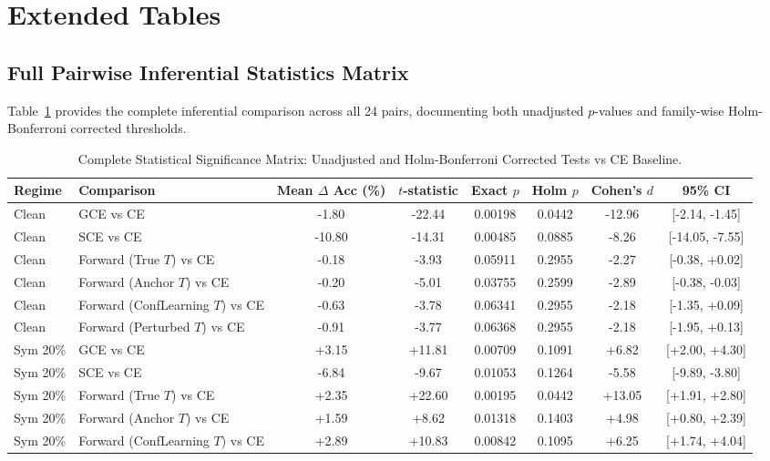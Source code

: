 \documentclass[10pt,twocolumn]{article}
\theoremstyle{definition}
\begin{document}
\section{Extended Tables}

\subsection{Full Pairwise Inferential Statistics Matrix}
Table~\ref{tab:app_pairwise} provides the complete inferential comparison across all 24 pairs, documenting both unadjusted $p$-values and family-wise Holm-Bonferroni corrected thresholds.

\begin{table}[h]
\centering
\caption{Complete Statistical Significance Matrix: Unadjusted and Holm-Bonferroni Corrected Tests vs CE Baseline.}
\label{tab:app_pairwise}
\small
\begin{tabular}{llcccccc}
\toprule
\textbf{Regime} & \textbf{Comparison} & \textbf{Mean $\Delta$ Acc (\%)} & \textbf{$t$-statistic} & \textbf{Exact $p$} & \textbf{Holm $p$} & \textbf{Cohen's $d$} & \textbf{95\% CI} \\
\midrule
Clean & GCE vs CE & -1.80 & -22.44 & 0.00198 & 0.0442 & -12.96 & [-2.14, -1.45] \\
Clean & SCE vs CE & -10.80 & -14.31 & 0.00485 & 0.0885 & -8.26 & [-14.05, -7.55] \\
Clean & Forward (True $T$) vs CE & -0.18 & -3.93 & 0.05911 & 0.2955 & -2.27 & [-0.38, +0.02] \\
Clean & Forward (Anchor $T$) vs CE & -0.20 & -5.01 & 0.03755 & 0.2599 & -2.89 & [-0.38, -0.03] \\
Clean & Forward (ConfLearning $T$) vs CE & -0.63 & -3.78 & 0.06341 & 0.2955 & -2.18 & [-1.35, +0.09] \\
Clean & Forward (Perturbed $T$) vs CE & -0.91 & -3.77 & 0.06368 & 0.2955 & -2.18 & [-1.95, +0.13] \\
\midrule
Sym 20\% & GCE vs CE & +3.15 & +11.81 & 0.00709 & 0.1091 & +6.82 & [+2.00, +4.30] \\
Sym 20\% & SCE vs CE & -6.84 & -9.67 & 0.01053 & 0.1264 & -5.58 & [-9.89, -3.80] \\
Sym 20\% & Forward (True $T$) vs CE & +2.35 & +22.60 & 0.00195 & 0.0442 & +13.05 & [+1.91, +2.80] \\
Sym 20\% & Forward (Anchor $T$) vs CE & +1.59 & +8.62 & 0.01318 & 0.1403 & +4.98 & [+0.80, +2.39] \\
Sym 20\% & Forward (ConfLearning $T$) vs CE & +2.89 & +10.83 & 0.00842 & 0.1095 & +6.25 & [+1.74, +4.04] \\

\end{tabular}
\end{table}
\end{document}
